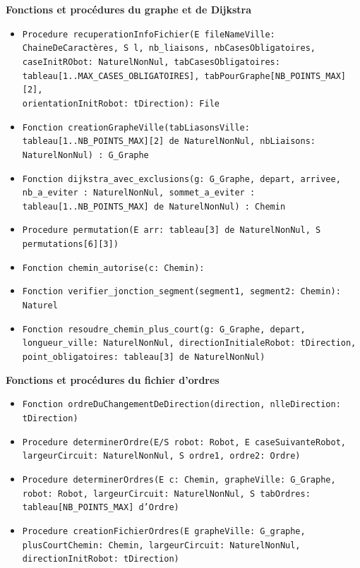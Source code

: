 \documentclass[11pt,a4paper]{article}
\begin{document}
\textbf{Fonctions et procédures du graphe et de Dijkstra}
\begin{itemize}
    \item\texttt{Procedure recuperationInfoFichier(E fileNameVille: ChaineDeCaractères, S l, nb\_liaisons, nbCasesObligatoires, caseInitRObot: NaturelNonNul, tabCasesObligatoires: tableau[1..MAX\_CASES\_OBLIGATOIRES], tabPourGraphe[NB\_POINTS\_MAX][2], \\orientationInitRobot: tDirection): File}
    \newline
    \item\texttt{Fonction creationGrapheVille(tabLiasonsVille: tableau[1..NB\_POINTS\_MAX][2] de NaturelNonNul, nbLiaisons: NaturelNonNul) : G\_Graphe}
    \newline
    \item\texttt{Fonction dijkstra\_avec\_exclusions(g: G\_Graphe, depart, arrivee, nb\_a\_eviter : NaturelNonNul, sommet\_a\_eviter : tableau[1..NB\_POINTS\_MAX] de NaturelNonNul) : Chemin}    
    \newline
    \item\texttt{Procedure permutation(E arr: tableau[3] de NaturelNonNul, S permutations[6][3])}
    \newline
    \item\texttt{Fonction chemin\_autorise(c: Chemin): }
    \newline
    \item\texttt{Fonction verifier\_jonction\_segment(segment1, segment2: Chemin): Naturel}
    \newline
    \item\texttt{Fonction resoudre\_chemin\_plus\_court(g: G\_Graphe, depart, longueur\_ville: NaturelNonNul, directionInitialeRobot: tDirection, point\_obligatoires: tableau[3] de NaturelNonNul)}
\end{itemize}

\vspace{1.1em}

\textbf{Fonctions et procédures du fichier d'ordres}
\begin{itemize}

    \item\texttt{Fonction ordreDuChangementDeDirection(direction, nlleDirection: tDirection)}
    \newline
    \item\texttt{Procedure determinerOrdre(E/S robot: Robot, E caseSuivanteRobot, largeurCircuit: NaturelNonNul, S ordre1, ordre2: Ordre)}
    \newline
    \item\texttt{Procedure determinerOrdres(E c: Chemin, grapheVille: G\_Graphe, robot: Robot, largeurCircuit: NaturelNonNul, S tabOrdres: tableau[NB\_POINTS\_MAX] d'Ordre)}
    \newline
    \item\texttt{Procedure creationFichierOrdres(E grapheVille: G\_graphe, plusCourtChemin: Chemin, largeurCircuit: NaturelNonNul, directionInitRobot: tDirection)}
    \newline
\end{itemize}
\end{document}
